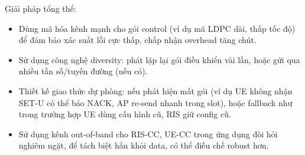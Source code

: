 Giải pháp tổng thể:
\begin{itemize}
    \item Dùng mã hóa kênh mạnh cho gói control (ví dụ mã LDPC dài, thấp tốc độ) để đảm bảo xác suất lỗi cực thấp, chấp nhận overhead tăng chút.
    \item Sử dụng công nghệ diversity: phát lặp lại gói điều khiển vài lần, hoặc gửi qua nhiều tần số/tuyến đường (nếu có).
    \item Thiết kế giao thức dự phòng: nếu phát hiện mất gói (ví dụ UE không nhận SET-U có thể báo NACK, AP re-send nhanh trong slot), hoặc fallback như trong trường hợp UE dùng cấu hình cũ, RIS giữ config cũ.
    \item Sử dụng kênh out-of-band cho RIS-CC, UE-CC trong ứng dụng đòi hỏi nghiêm ngặt, để tách biệt hẳn khỏi data, có thể điều chế robust hơn.
\end{itemize}